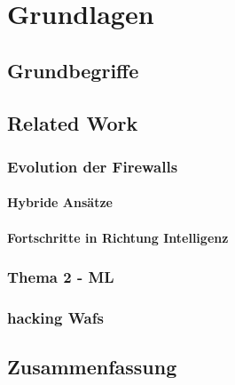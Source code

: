 \chapter{Grundlagen}


\section{Grundbegriffe}

\section{Related Work} %

\subsection{Evolution der Firewalls}

\subsubsection{Hybride Ansätze}


\subsubsection{Fortschritte in Richtung Intelligenz}


\subsection{Thema 2 - ML}


\subsection{hacking Wafs}


\section{Zusammenfassung}
